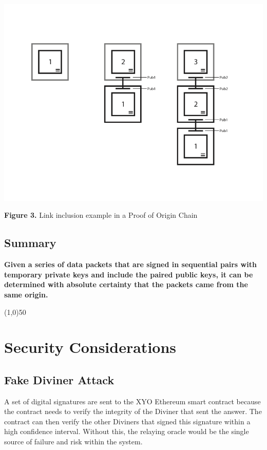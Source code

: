 \documentclass{article}
\begin{document}
\includegraphics[width=\textwidth] {proofoforigin}
\begin{center}\textbf{Figure 3.}  Link inclusion example in a Proof of Origin Chain
\end{center}

\subsection {Summary}
\textbf{Given a series of data packets that are signed in sequential pairs with temporary private keys and include the paired public keys, it can be determined with absolute \gls{certainty} that the packets came from the same origin.}

\begin{center}
\line(1,0){50}
\end{center}

\section{Security Considerations}

\subsection{Fake Diviner Attack}

A set of digital signatures are sent to the XYO Ethereum smart contract because the contract needs to verify the integrity of the Diviner that sent the answer. The contract can then verify the other Diviners that signed this signature within a high confidence interval. Without this, the relaying oracle would be the single source of failure and risk within the system.
\end{document}
